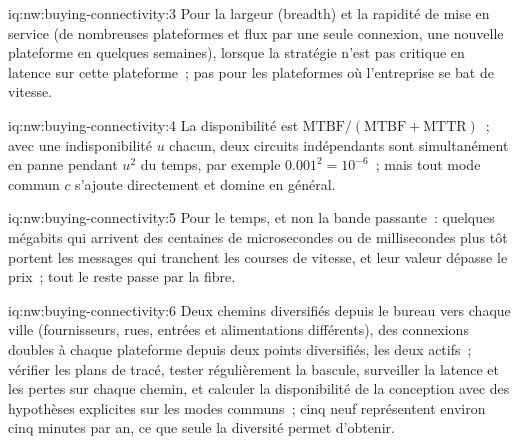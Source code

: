 \begin{solution}{iq:nw:buying-connectivity:3}
Pour la largeur (breadth) et la rapidité de mise en service (de nombreuses plateformes et flux par une seule connexion, une nouvelle plateforme en quelques semaines), lorsque la stratégie n'est pas critique en latence sur
cette plateforme~; pas pour les plateformes où l'entreprise se bat de vitesse.
\end{solution}

\begin{solution}{iq:nw:buying-connectivity:4}
La disponibilité est $\mathrm{MTBF}/(\mathrm{MTBF}+\mathrm{MTTR})$~; avec une indisponibilité $u$ chacun, deux circuits indépendants sont simultanément en panne pendant $u^2$ du temps,
par exemple $0.001^2 = 10^{-6}$~; mais tout mode commun $c$ s'ajoute directement et domine en général.
\end{solution}

\begin{solution}{iq:nw:buying-connectivity:5}
Pour le temps, et non la bande passante~: quelques mégabits qui arrivent des centaines de microsecondes ou de millisecondes plus tôt portent les messages qui tranchent les courses de vitesse, et
leur valeur dépasse le prix~; tout le reste passe par la fibre.
\end{solution}

\begin{solution}{iq:nw:buying-connectivity:6}
Deux chemins diversifiés depuis le bureau vers chaque ville (fournisseurs, rues, entrées et alimentations différents), des connexions doubles à chaque plateforme depuis deux
points diversifiés, les deux actifs~; vérifier les plans de tracé, tester régulièrement la bascule, surveiller la latence et les pertes sur chaque chemin, et calculer la disponibilité de la conception avec
des hypothèses explicites sur les modes communs~; cinq neuf représentent environ cinq minutes par an, ce que seule la diversité permet d'obtenir.
\end{solution}
